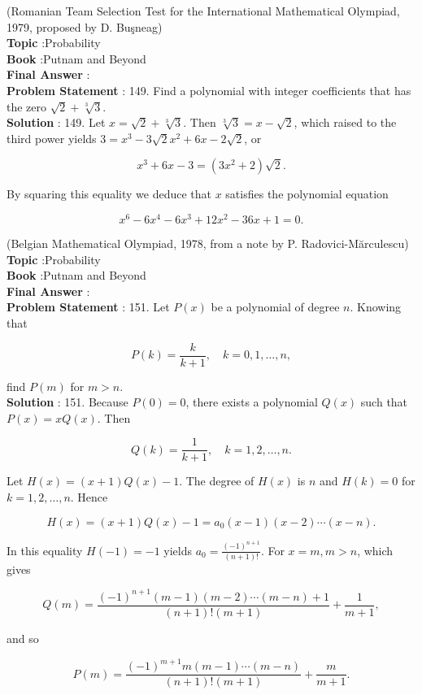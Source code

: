 \documentclass[10pt]{article}
\begin{document}
(Romanian Team Selection Test for the International Mathematical Olympiad, 1979, proposed by D. Buşneag)
\\
\textbf{Topic} :Probability\\
\textbf{Book} :Putnam and Beyond\\
\textbf{Final Answer} :\\


\textbf{Problem Statement} :
149. Find a polynomial with integer coefficients that has the zero $\sqrt{2}+\sqrt[3]{3}$.
\\
\textbf{Solution} :
149. Let $x=\sqrt{2}+\sqrt[3]{3}$. Then $\sqrt[3]{3}=x-\sqrt{2}$, which raised to the third power yields $3=x^{3}-3 \sqrt{2} x^{2}+6 x-2 \sqrt{2}$, or

$$
x^{3}+6 x-3=\left(3 x^{2}+2\right) \sqrt{2} .
$$

By squaring this equality we deduce that $x$ satisfies the polynomial equation

$$
x^{6}-6 x^{4}-6 x^{3}+12 x^{2}-36 x+1=0 .
$$

(Belgian Mathematical Olympiad, 1978, from a note by P. Radovici-Mărculescu)
\\
\textbf{Topic} :Probability\\
\textbf{Book} :Putnam and Beyond\\
\textbf{Final Answer} :\\


\textbf{Problem Statement} :
151. Let $P(x)$ be a polynomial of degree $n$. Knowing that

$$
P(k)=\frac{k}{k+1}, \quad k=0,1, \ldots, n,
$$

find $P(m)$ for $m>n$.
\\
\textbf{Solution} :
151. Because $P(0)=0$, there exists a polynomial $Q(x)$ such that $P(x)=x Q(x)$. Then

$$
Q(k)=\frac{1}{k+1}, \quad k=1,2, \ldots, n .
$$

Let $H(x)=(x+1) Q(x)-1$. The degree of $H(x)$ is $n$ and $H(k)=0$ for $k=1,2, \ldots, n$. Hence

$$
H(x)=(x+1) Q(x)-1=a_{0}(x-1)(x-2) \cdots(x-n) .
$$

In this equality $H(-1)=-1$ yields $a_{0}=\frac{(-1)^{n+1}}{(n+1) !}$. For $x=m, m>n$, which gives

$$
Q(m)=\frac{(-1)^{n+1}(m-1)(m-2) \cdots(m-n)+1}{(n+1) !(m+1)}+\frac{1}{m+1},
$$

and so 

$$
P(m)=\frac{(-1)^{m+1} m(m-1) \cdots(m-n)}{(n+1) !(m+1)}+\frac{m}{m+1} .
$$
\end{document}

